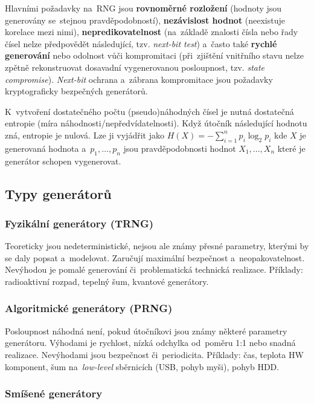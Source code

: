 Hlavními požadavky na~RNG jsou \textbf{rovnoměrné rozložení} (hodnoty jsou generovány se~stejnou pravděpodobností), \textbf{nezávislost hodnot} (neexistuje korelace mezi nimi), \textbf{nepredikovatelnost} (na~základě znalosti čísla nebo řady čísel nelze předpovědět následující, tzv. \emph{next-bit test}) a~často také \textbf{rychlé generování} nebo odolnost vůči kompromitaci (při~zjištění vnitřního stavu nelze zpětně rekonstruovat dosavadní vygenerovanou posloupnost, tzv. \emph{state compromise}). \emph{Next-bit} ochrana a~zábrana kompromitace jsou požadavky kryptograficky bezpečných generátorů.

K~vytvoření dostatečného počtu (pseudo)náhodných čísel je nutná dostatečná entropie (míra náhodnosti/nepředvídatelnosti). Když útočník následující hodnotu zná, entropie je nulová. Lze ji vyjádřit jako $H(X) = - \sum_{i=1}^{n} p_i \log_2 p_i$ kde $X$ je generovaná hodnota a~$p_1, \dots, p_n$ jsou pravděpodobnosti hodnot $X_1, \dots, X_n$ které je generátor schopen vygenerovat.

\subsection{Typy generátorů}

\subsubsection*{Fyzikální generátory (TRNG)}

Teoreticky jsou nedeterministické, nejsou ale známy přesné parametry, kterými by se daly popsat a~modelovat. Zaručují maximální bezpečnost a~neopakovatelnost. Nevýhodou je pomalé generování či~problematická technická realizace. Příklady: radioaktivní rozpad, tepelný šum, kvantové generátory.

\subsubsection*{Algoritmické generátory (PRNG)}

Posloupnost náhodná není, pokud útočníkovi jsou známy některé parametry generátoru. Výhodami je rychlost, nízká odchylka od~poměru 1:1 nebo snadná realizace. Nevýhodami jsou bezpečnost či~periodicita. Příklady: čas, teplota HW komponent, šum na~\emph{low-level} sběrnicích (USB, pohyb myši), pohyb HDD.

\subsubsection*{Smíšené generátory}

